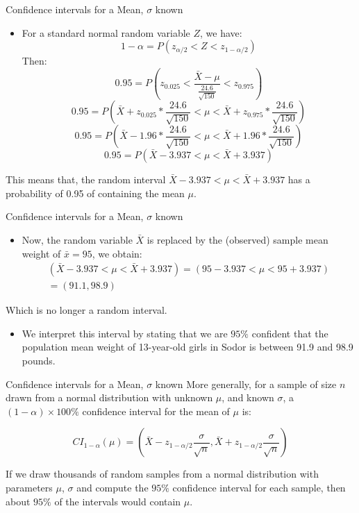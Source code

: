 \documentclass[
  ignorenonframetext,
]{beamer}
\providecommand{\tightlist}{%
  \setlength{\itemsep}{0pt}\setlength{\parskip}{0pt}}
\begin{document}
\begin{frame}{Confidence intervals for a Mean, \(\sigma\) known}
\protect\hypertarget{confidence-intervals-for-a-mean-sigma-known-2}{}
\begin{itemize}
\tightlist
\item
  For a standard normal random variable \(Z\), we have:
  \[1-\alpha=P(z_{\alpha/2}<Z<z_{1-\alpha/2})\] Then:
  \[0.95=P(z_{0.025}<\frac{\bar{X}-\mu}{\frac{24.6}{\sqrt{150}}}<z_{0.975})\]
  \[0.95=P(\bar{X}+z_{0.025}*\frac{24.6}{\sqrt{150}}<\mu<\bar{X}+z_{0.975}*\frac{24.6}{\sqrt{150}})\]
  \[0.95=P(\bar{X}-1.96*\frac{24.6}{\sqrt{150}}<\mu<\bar{X}+1.96*\frac{24.6}{\sqrt{150}})\]
  \[0.95=P(\bar{X}-3.937<\mu<\bar{X}+3.937)\]
\end{itemize}

This means that, the random interval \(\bar{X}-3.937<\mu<\bar{X}+3.937\)
has a probability of 0.95 of containing the mean \(\mu\).
\end{frame}

\begin{frame}{Confidence intervals for a Mean, \(\sigma\) known}
\protect\hypertarget{confidence-intervals-for-a-mean-sigma-known-3}{}
\begin{itemize}
\tightlist
\item
  Now, the random variable \(\bar{X}\) is replaced by the (observed)
  sample mean weight of \(\bar{x}=95\), we obtain: \[\begin{array}{ll}
  (\bar{X}-3.937<\mu<\bar{X}+3.937)=(95-3.937<\mu<95+3.937)\\
  =(91.1, 98.9)\end{array}\]
\end{itemize}

Which is no longer a random interval.

\begin{itemize}
\tightlist
\item
  We interpret this interval by stating that we are \(95\%\) confident
  that the population mean weight of 13-year-old girls in Sodor is
  between 91.9 and 98.9 pounds.
\end{itemize}
\end{frame}

\begin{frame}{Confidence intervals for a Mean, \(\sigma\) known}
\protect\hypertarget{confidence-intervals-for-a-mean-sigma-known-4}{}
More generally, for a sample of size \(n\) drawn from a normal
distribution with unknown \(\mu\), and known \(\sigma\), a
\((1-\alpha)\times 100\%\) confidence interval for the mean of \(\mu\)
is:

\[CI_{1-\alpha}(\mu)=(\bar{X}-z_{1-\alpha/2}\frac{\sigma}{\sqrt{n}},\bar{X}+z_{1-\alpha/2}\frac{\sigma}{\sqrt{n}})\]

If we draw thousands of random samples from a normal distribution with
parameters \(\mu\), \(\sigma\) and compute the \(95\%\) confidence
interval for each sample, then about \(95\%\) of the intervals would
contain \(\mu\).
\end{frame}
\end{document}
